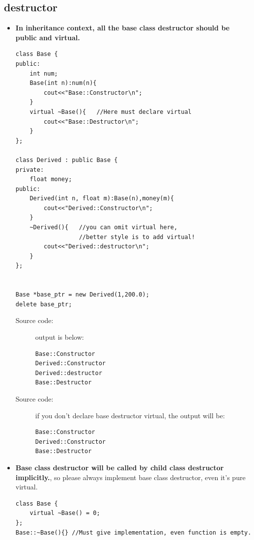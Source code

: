 \documentclass[a4paper,11pt,twoside]{book}
\begin{document}
\subsection{destructor}
\begin{itemize}
	\item \textbf{In inheritance context, all the base class destructor should be public and virtual.}  
\begin{lstlisting}[numbers=none]
class Base {
public:
	int num;
	Base(int n):num(n){
		cout<<"Base::Constructor\n";
	}
	virtual ~Base(){   //Here must declare virtual
		cout<<"Base::Destructor\n";
	}
};

class Derived : public Base {
private:
	float money;
public:
	Derived(int n, float m):Base(n),money(m){
		cout<<"Derived::Constructor\n";
	}
	~Derived(){   //you can omit virtual here, 
			      //better style is to add virtual!
		cout<<"Derived::destructor\n";
	}
};


Base *base_ptr = new Derived(1,200.0);
delete base_ptr;
\end{lstlisting}
\begin{description}
	\item[Source code:] output is below: 
\begin{verbatim}
Base::Constructor                                                                                               
Derived::Constructor
Derived::destructor                                                                        
Base::Destructor 
\end{verbatim}
		\item[Source code:] if you don't declare base destructor virtual, the output will be:
\begin{verbatim}
Base::Constructor                                                                                               
Derived::Constructor                                                                        
Base::Destructor 
\end{verbatim}
	
\end{description}

	\item \textbf{Base class destructor will be called by child class destructor implicitly.}, so please always implement base class destructor, even it's pure virtual. 
\begin{lstlisting}[numbers=none]
class Base {
	virtual ~Base() = 0;
};
Base::~Base(){} //Must give implementation, even function is empty. 
\end{lstlisting}	
	

\end{itemize}
\end{document}
